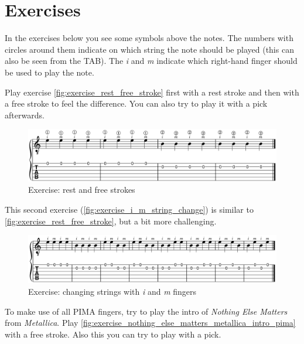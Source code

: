 \section{Exercises}

In the exercises below you see some symbols above the notes. The numbers with circles around them indicate on which string the note should be played (this can also be seen from the TAB). The \textit{i} and \textit{m} indicate which right-hand finger should be used to play the note.

Play exercise \autoref{fig:exercise_rest_free_stroke} first with a rest stroke and then with a free stroke to feel the difference. You can also try to play it with a pick afterwards.

\begin{figure}[h]
    \centering
    \includegraphics[width=\textwidth]{../../MuseScore/Guitar/OpenEnVallendeAanslag.png}
    \caption{Exercise: rest and free strokes}
    \label{fig:exercise_rest_free_stroke}
\end{figure}

This second exercise (\autoref{fig:exercise_i_m_string_change}) is similar to \autoref{fig:exercise_rest_free_stroke}, but a bit more challenging.

\begin{figure}[h]
    \centering
    \includegraphics[width=\textwidth]{../../MuseScore/Guitar/TwoStringAlternating.png}
    \caption{Exercise: changing strings with \textit{i} and \textit{m} fingers}
    \label{fig:exercise_i_m_string_change}
\end{figure}

To make use of all PIMA fingers, try to play the intro of \textit{Nothing Else Matters} from \textit{Metallica}. Play \autoref{fig:exercise_nothing_else_matters_metallica_intro_pima} with a free stroke. Also this you can try to play with a pick.


